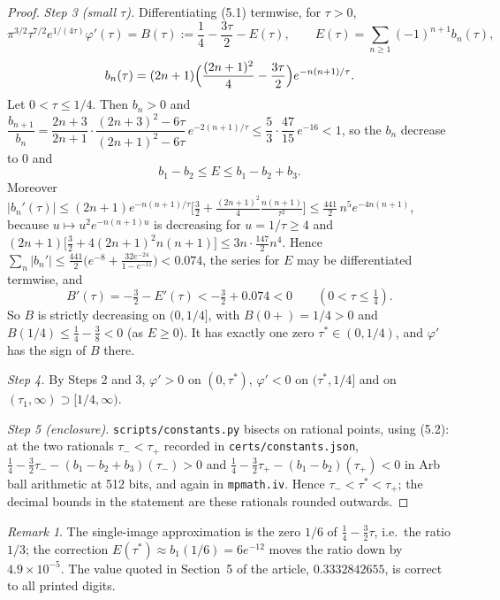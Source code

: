 \documentclass[11pt,a4paper]{article}
\theoremstyle{definition}
\theoremstyle{remark}
\newtheorem{remark}[theorem]{Remark}
\begin{document}
\begin{proof}
\emph{Step 3 (small $\tau$).} Differentiating (5.1) termwise, for $\tau>0$,
\[
\pi^{3/2}\tau^{7/2}e^{1/(4\tau)}\varphi'(\tau)=B(\tau):=\frac14-\frac{3\tau}2-E(\tau),\qquad E(\tau)=\sum_{n\ge1}(-1)^{n+1}b_n(\tau),
\]
\[
b_n(\tau)=(2n+1)\Bigl(\frac{(2n+1)^2}{4}-\frac{3\tau}{2}\Bigr)e^{-n(n+1)/\tau}.
\]
Let $0<\tau\le1/4$. Then $b_n>0$ and
$\dfrac{b_{n+1}}{b_n}=\dfrac{2n+3}{2n+1}\cdot\dfrac{(2n+3)^2-6\tau}{(2n+1)^2-6\tau}\,e^{-2(n+1)/\tau}\le\dfrac53\cdot\dfrac{47}{15}\,e^{-16}<1$,
so the $b_n$ decrease to $0$ and
\[
b_1-b_2\le E\le b_1-b_2+b_3 . \tag{5.2}
\]
Moreover $|b_n'(\tau)|\le(2n+1)e^{-n(n+1)/\tau}\bigl[\tfrac32+\tfrac{(2n+1)^2}{4}\tfrac{n(n+1)}{\tau^2}\bigr]\le\tfrac{441}{2}\,n^5e^{-4n(n+1)}$, because $u\mapsto u^2e^{-n(n+1)u}$ is decreasing for $u=1/\tau\ge4$ and $(2n+1)\bigl[\tfrac32+4(2n+1)^2n(n+1)\bigr]\le3n\cdot\tfrac{147}{2}n^4$. Hence $\sum_n|b_n'|\le\frac{441}2\bigl(e^{-8}+\frac{32e^{-24}}{1-e^{-11}}\bigr)<0.074$, the series for $E$ may be differentiated termwise, and
\[
B'(\tau)=-\tfrac32-E'(\tau)<-\tfrac32+0.074<0\qquad(0<\tau\le\tfrac14).
\]
So $B$ is strictly decreasing on $(0,1/4]$, with $B(0+)=1/4>0$ and $B(1/4)\le\frac14-\frac38<0$ (as $E\ge0$). It has exactly one zero $\tau^*\in(0,1/4)$, and $\varphi'$ has the sign of $B$ there.

\emph{Step 4.} By Steps 2 and 3, $\varphi'>0$ on $(0,\tau^*)$, $\varphi'<0$ on $(\tau^*,1/4]$ and on $(\tau_1,\infty)\supset[1/4,\infty)$.

\emph{Step 5 (enclosure).} \texttt{scripts/constants.py} bisects on rational points, using (5.2): at the two rationals $\tau_-<\tau_+$ recorded in \texttt{certs/constants.json}, $\frac14-\frac32\tau_--(b_1-b_2+b_3)(\tau_-)>0$ and $\frac14-\frac32\tau_+-(b_1-b_2)(\tau_+)<0$ in Arb ball arithmetic at 512 bits, and again in \texttt{mpmath.iv}. Hence $\tau_-<\tau^*<\tau_+$; the decimal bounds in the statement are these rationals rounded outwards.
\end{proof}

\begin{remark}
The single-image approximation is the zero $1/6$ of $\frac14-\frac32\tau$, i.e.\ the ratio $1/3$; the correction $E(\tau^*)\approx b_1(1/6)=6e^{-12}$ moves the ratio down by $4.9\times10^{-5}$. The value quoted in Section~5 of the article, $0.3332842655$, is correct to all printed digits.
\end{remark}
\end{document}
